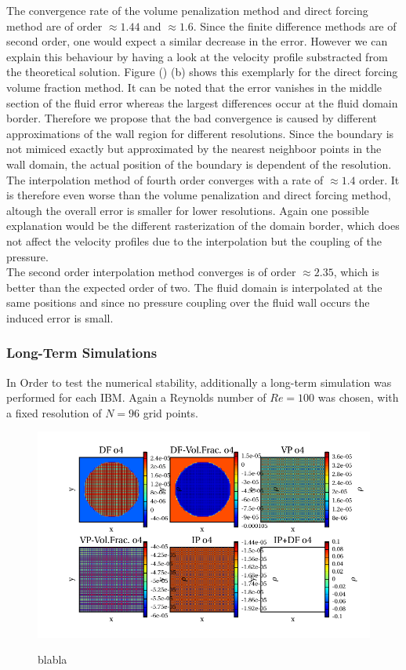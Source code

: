 The convergence rate of the volume penalization method and direct forcing method are of order $\approx 1.44$ and $\approx 1.6$.
Since the finite difference methods are of second order, one would expect a similar decrease in the error.
However we can explain this behaviour by having a look at the velocity profile substracted from the theoretical solution.
Figure () (b) shows this exemplarly for the direct forcing volume fraction method. It can be noted that
the error vanishes in the middle section of the fluid error whereas the largest differences occur at the fluid domain border.
Therefore we propose that the bad convergence is caused by different approximations of the wall region for different resolutions.
Since the boundary is not mimiced exactly but approximated by the nearest neighboor points in the wall domain, the actual position
of the boundary is dependent of the resolution.\\
The interpolation method of fourth order converges with a rate of $\approx 1.4$ order. It is therefore even worse than the volume penalization and
direct forcing method, altough the overall error is smaller for lower resolutions. Again one possible explanation would be the different rasterization
of the domain border, which does not affect the velocity profiles due to the interpolation but the coupling of the pressure.\\
The second order interpolation method converges is of order $\approx 2.35$, which is better than the expected order of two.
The fluid domain is interpolated at the same positions and since no pressure coupling over the fluid wall occurs the induced error is small.


\subsubsection{Long-Term Simulations}

In Order to test the  numerical stability, additionally a long-term simulation was performed for each IBM.
Again a Reynolds number of $Re=100$ was chosen, with a fixed resolution of $N=96$ grid points.


\begin{figure}[!pt]
  \centering
  \includegraphics{gfx/immersed_boundary/hpflow/long/rho.pdf}\label{fig:hpflow_allgc_theo}
  \caption{blabla}
\end{figure}

